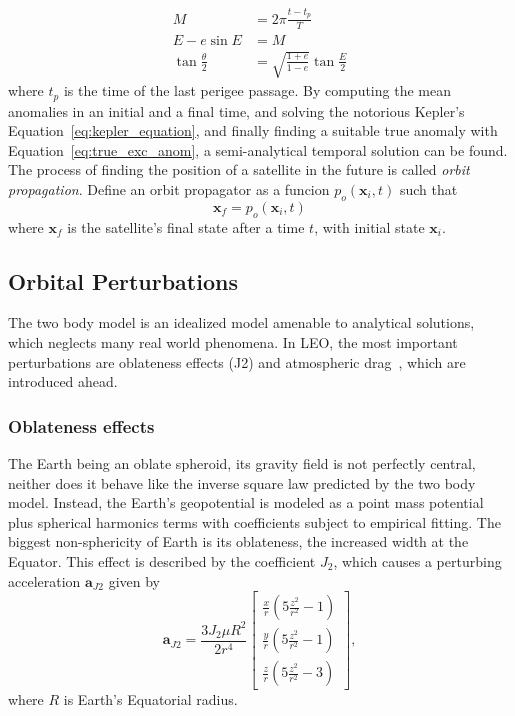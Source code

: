 \begin{align} 
        M &= 2\pi \frac{t - t_p}{T} \\
        E - e \sin{E} &= M \label{eq:kepler_equation}\\
        \tan{\frac{\theta}{2}} &= \sqrt{\frac{1+e}{1-e}} \tan{\frac{E}{2}} \label{eq:true_exc_anom}
\end{align}
where \(t_p\) is the time of the last perigee passage. By computing the mean anomalies in an initial and a final time, and solving the notorious Kepler's Equation~\eqref{eq:kepler_equation}, and finally finding a suitable true anomaly with Equation~\eqref{eq:true_exc_anom}, a semi-analytical temporal solution can be found. The process of finding the position of a satellite in the future is called \textit{orbit propagation}. Define an orbit propagator as a funcion \(p_o(\mathbf{x}_i, t)\) such that
\begin{equation} \label{eq:orbit_propagator}
    \mathbf{x}_f = p_o(\mathbf{x}_i, t)
\end{equation}
where \(\mathbf{x}_f\) is the satellite's final state after a time \(t\), with initial state \(\mathbf{x}_i\).

\subsection{Orbital Perturbations}

The two body model is an idealized model amenable to analytical solutions, which neglects many real world phenomena. In LEO, the most important perturbations are oblateness effects (J2) and atmospheric drag~\cite{curtis2015orbital}, which are introduced ahead.

\subsubsection{Oblateness effects}

The Earth being an oblate spheroid, its gravity field is not perfectly central, neither does it behave like the inverse square law predicted by the two body model. Instead, the Earth's geopotential is modeled as a point mass potential plus spherical harmonics terms with coefficients subject to empirical fitting. The biggest non-sphericity of Earth is its oblateness, the increased width at the Equator. This effect is described by the coefficient \(J_2\), which causes a perturbing acceleration \(\mathbf{a}_{J2}\) given by
\begin{equation}\label{eq:j2_acc}
    \mathbf{a}_{J2} = \frac{3 J_2 \mu R^2}{2 r^4} \begin{bmatrix}
        \frac{x}{r} \left(5 \frac{z^2}{r^2} - 1\right) \\
        \frac{y}{r} \left(5 \frac{z^2}{r^2} - 1\right) \\
        \frac{z}{r} \left(5 \frac{z^2}{r^2} - 3\right)
    \end{bmatrix},
\end{equation}
where \(R\) is Earth's Equatorial radius.

